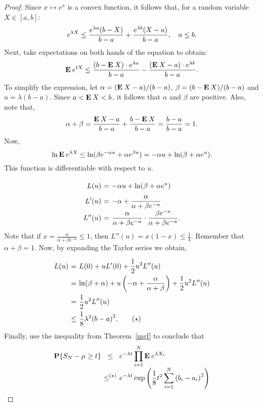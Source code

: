 \begin{proof}
  Since $x \mapsto e^x$ is a convex function, it follows that, for a random variable $X \in [a,b]$:
  \[ e^{\lambda X} \leq \frac{e^{\lambda a}(b-X)}{b-a} + \frac{e^{\lambda b}(X-a)}{b-a},\hspace*{1em} a \leq b. \]
  Next, take expectations on both hands of the equation to obtain:
  \[ \mathbf{E}\: e^{tX} \leq \frac{(b-\mathbf{E}\: X) \cdot e^{\lambda a}}{b-a} - \frac{(\mathbf{E}\: X -a) \cdot e^{\lambda b}}{b-a}. \]
  To simplify the expression, let $\alpha = (\mathbf{E}\: X -a)/(b-a)$, $\beta = (b-\mathbf{E}\: X)/(b-a)$ and $u = \lambda (b-a)$. Since $a < \mathbf{E}\: X < b$, it follows that $\alpha$ and $\beta$ are positive. Also, note that,
  \[ \alpha + \beta = \frac{\mathbf{E}\: X-a}{b-a} + \frac{b-\mathbf{E}\: X}{b-a} = \frac{b-a}{b-a} = 1. \] 
  Now,
  \[ \ln \mathbf{E}\: e^{\lambda X} \leq \ln (\beta e^{-\alpha u} + \alpha e^{\beta u}) = -\alpha u + \ln(\beta + \alpha e^{u}). \] 
  This function is differentiable with respect to $u$.
  \[\everymath{\displaystyle}\arraycolsep=1.8pt\def\arraystretch{1.8}
    \begin{array}{rcl}
    L(u) & = & -\alpha u + \ln(\beta + \alpha e^{u})\\
    L'(u) & = & -\alpha + \frac{\alpha}{\alpha + \beta e^{-u}}\\
    L''(u) & = & \frac{\alpha}{\alpha + \beta e^{-u}} \cdot \frac{\beta e^{-u}}{\alpha + \beta e^{-u}}.
  \end{array} \]
  Note that if $x = \frac{\alpha}{\alpha + \beta e^{-u}} \leq 1$, then $L''(u) = x(1-x) \leq \frac{1}{4}$. Remember that $\alpha + \beta = 1$. Now, by expanding the Taylor series we obtain,
  \[\everymath{\displaystyle}\arraycolsep=1.8pt\def\arraystretch{2}
  \begin{array}{rcl}
    L(u) & = & L(0) + uL'(0) + \frac{1}{2} u^2 L''(u)\\
    & = &\ln(\beta + \alpha) + u \left(-\alpha + \frac{\alpha}{\alpha + \beta}\right) + \frac{1}{2} u^2 L''(u) \\
    & = & \frac{1}{2} u^2 L''(u)\\
    &\leq & \frac{1}{8}\lambda^2 {(b-a)}^2. \tag{$\star$}
  \end{array} \]
  Finally, use the inequality from Theorem~\ref{mgf} to conclude that
  \[\everymath{\displaystyle}\arraycolsep=1.8pt\def\arraystretch{2}
    \begin{array}{rcl}
      \P\{S_N-\mu \geq t\} & \leq & e^{-\lambda t} \prod_{i = 1}^N \E e^{\lambda X_i} \\
      &\leq^{(\star)} & e^{-\lambda t} \exp\left(\frac{1}{8}t^2 \sum_{i = 1}^{N} {(b_i-a_i)}^2\right)
    \end{array}\]  

\end{proof}



